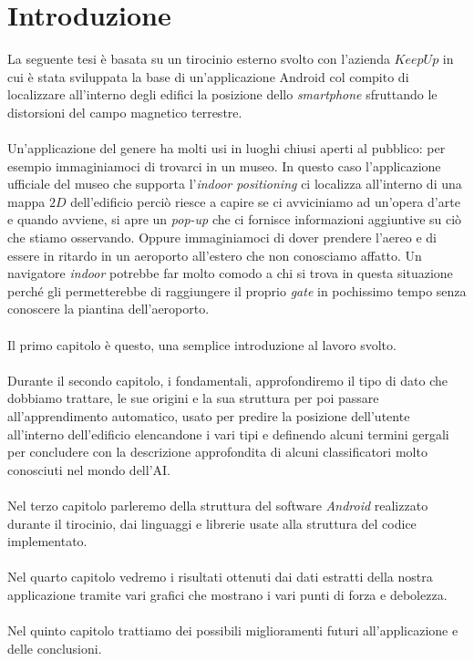 \chapter{Introduzione}
La seguente tesi \`e basata su un tirocinio esterno svolto con l'azienda $KeepUp$ in cui \`e stata sviluppata la base di un'applicazione Android col compito di localizzare all'interno degli edifici la posizione dello \textit{smartphone} sfruttando le distorsioni del campo magnetico terrestre\cite{6418880}.
\\\\
Un'applicazione del genere ha molti usi in luoghi chiusi aperti al pubblico: per esempio immaginiamoci di trovarci in un museo. In questo caso l'applicazione ufficiale del museo che supporta l'\textit{indoor positioning} ci localizza all'interno di una mappa $2D$ dell'edificio perci\`o riesce a capire se ci avviciniamo ad un'opera d'arte e quando avviene, si apre un \textit{pop-up} che ci fornisce informazioni aggiuntive su ci\`o che stiamo osservando. Oppure immaginiamoci di dover prendere l'aereo e di essere in ritardo in un aeroporto all'estero che non conosciamo affatto. Un navigatore \textit{indoor} potrebbe far molto comodo a chi si trova in questa situazione perch\'e gli permetterebbe di raggiungere il proprio \textit{gate} in pochissimo tempo senza conoscere la piantina dell'aeroporto.
\\\\
Il primo capitolo \`e questo, una semplice introduzione al lavoro svolto.
\\\\
Durante il secondo capitolo, i fondamentali, approfondiremo il tipo di dato che dobbiamo trattare, le sue origini e la sua struttura per poi passare all'apprendimento automatico, usato per predire la posizione dell'utente all'interno dell'edificio elencandone i vari tipi e definendo alcuni termini gergali per concludere con la descrizione approfondita di alcuni classificatori molto conosciuti nel mondo dell'AI.
\\\\
Nel terzo capitolo parleremo della struttura del software \textit{Android} realizzato durante il tirocinio, dai linguaggi e librerie usate alla struttura del codice implementato.
\\\\
Nel quarto capitolo vedremo i risultati ottenuti dai dati estratti della nostra applicazione tramite vari grafici che mostrano i vari punti di forza e debolezza.
\\\\
Nel quinto capitolo trattiamo dei possibili miglioramenti futuri all'applicazione e delle conclusioni.